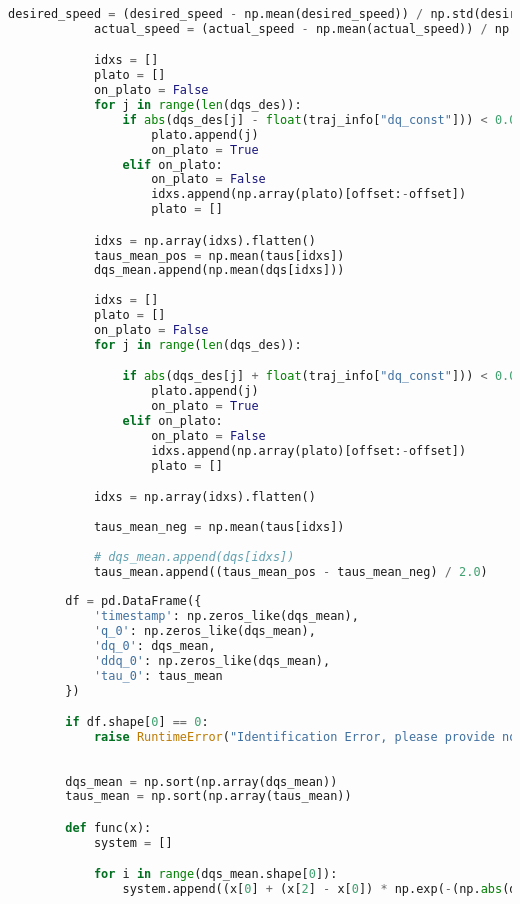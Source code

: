 \begin{lstlisting}[language=python, caption=\raggedright{identification/friction.py}, frame=single]
            desired_speed = (desired_speed - np.mean(desired_speed)) / np.std(desired_speed)
            actual_speed = (actual_speed - np.mean(actual_speed)) / np.std(actual_speed)

            idxs = []
            plato = []
            on_plato = False
            for j in range(len(dqs_des)):
                if abs(dqs_des[j] - float(traj_info["dq_const"])) < 0.001:
                    plato.append(j)
                    on_plato = True
                elif on_plato:
                    on_plato = False
                    idxs.append(np.array(plato)[offset:-offset])
                    plato = []

            idxs = np.array(idxs).flatten()
            taus_mean_pos = np.mean(taus[idxs])
            dqs_mean.append(np.mean(dqs[idxs]))
            
            idxs = []
            plato = []
            on_plato = False
            for j in range(len(dqs_des)):

                if abs(dqs_des[j] + float(traj_info["dq_const"])) < 0.001:
                    plato.append(j)
                    on_plato = True
                elif on_plato:
                    on_plato = False
                    idxs.append(np.array(plato)[offset:-offset])
                    plato = []

            idxs = np.array(idxs).flatten()
            
            taus_mean_neg = np.mean(taus[idxs])
            
            # dqs_mean.append(dqs[idxs])
            taus_mean.append((taus_mean_pos - taus_mean_neg) / 2.0)
           
        df = pd.DataFrame({
            'timestamp': np.zeros_like(dqs_mean),
            'q_0': np.zeros_like(dqs_mean),
            'dq_0': dqs_mean, 
            'ddq_0': np.zeros_like(dqs_mean),
            'tau_0': taus_mean  
        })

        if df.shape[0] == 0:
            raise RuntimeError("Identification Error, please provide not empty dataset")
        
       
        dqs_mean = np.sort(np.array(dqs_mean))
        taus_mean = np.sort(np.array(taus_mean))

        def func(x):
            system = []

            for i in range(dqs_mean.shape[0]):
                system.append((x[0] + (x[2] - x[0]) * np.exp(-(np.abs(dqs_mean[i] / x[3])**x[4]))) * np.sign(dqs_mean[i]) + x[1] * dqs_mean[i] - taus_mean[i])
            

\end{lstlisting}
